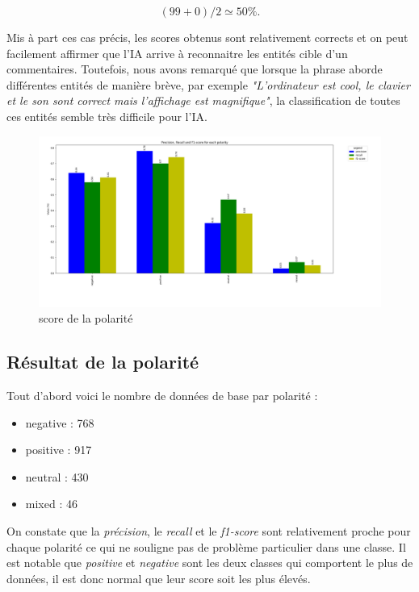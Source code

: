 \documentclass[12pt ,a4paper ]{article}
\begin{document}
\begin{multicols}{2}
\begin{equation}
(99 + 0) / 2 \simeq 50 \%.
\end{equation}

Mis à part ces cas précis, les scores obtenus sont relativement corrects et on peut facilement affirmer que l'IA arrive à reconnaitre les entités cible d'un commentaires. Toutefois, nous avons remarqué que lorsque la phrase aborde différentes entités de manière brève, par exemple \textit{"L'ordinateur est cool, le clavier et le son sont correct mais l'affichage est magnifique"}, la classification de toutes ces entités semble très difficile pour l'IA. \\

\begin{figure}[t]
    \begin{center}
        \includegraphics[width=1.15\textwidth]{polarity_plot.png}
    \end{center}
    \caption{score de la polarité}
\end{figure}
\newpage
\subsection{Résultat de la polarité}
Tout d'abord voici le nombre de données de base par polarité :
\begin{itemize}
\item negative : 768
\item positive : 917
\item neutral : 430
\item mixed : 46
\end{itemize}
\medskip
On constate que la \textit{précision}, le \textit{recall} et le \textit{f1-score} sont relativement proche pour chaque polarité ce qui ne souligne pas de problème particulier dans une classe. 
Il est notable que \textit{positive} et \textit{negative} sont les deux  classes qui comportent le plus de données, il est donc normal que leur score soit les plus élevés. \\


\end{multicols}
\end{document}

